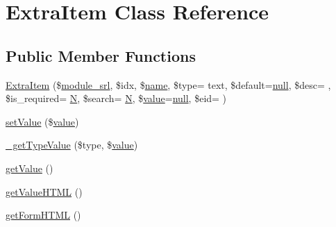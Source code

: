\hypertarget{classExtraItem}{}\section{Extra\+Item Class Reference}
\label{classExtraItem}
\subsection*{Public Member Functions}
\begin{DoxyCompactItemize}
\item 
\hyperlink{classExtraItem_abdf34ec801688507ddbc1acd513d2f8d}{Extra\+Item} (\$\hyperlink{ko_8install_8php_a370bb6450fab1da3e0ed9f484a38b761}{module\+\_\+srl}, \$idx, \$\hyperlink{common_8js_a22c29d2aa8ed6161ce8faa718ef76e68}{name}, \$type= \textquotesingle{}text\textquotesingle{}, \$default=\hyperlink{modernizr_8min_8js_a286f9ec831c5e676eeb493248eab9575}{null}, \$desc= \textquotesingle{}\textquotesingle{}, \$is\+\_\+required= \textquotesingle{}\hyperlink{jquery-1_8x_8min_8js_ab8a5cba0bbaa18ec7f830663874cb9d0}{N}\textquotesingle{}, \$search= \textquotesingle{}\hyperlink{jquery-1_8x_8min_8js_ab8a5cba0bbaa18ec7f830663874cb9d0}{N}\textquotesingle{}, \$\hyperlink{common_2js_2jquery_8js_abe5393d870043cf6aaa1d5ad5fce755c}{value}=\hyperlink{modernizr_8min_8js_a286f9ec831c5e676eeb493248eab9575}{null}, \$eid= \textquotesingle{}\textquotesingle{})
\item 
\hyperlink{classExtraItem_a6bec289dc0622bd882a36cb9b5680b03}{set\+Value} (\$\hyperlink{common_2js_2jquery_8js_abe5393d870043cf6aaa1d5ad5fce755c}{value})
\item 
\hyperlink{classExtraItem_ac285a098cdd05b2c152b3d94c8cb95db}{\+\_\+get\+Type\+Value} (\$type, \$\hyperlink{common_2js_2jquery_8js_abe5393d870043cf6aaa1d5ad5fce755c}{value})
\item 
\hyperlink{classExtraItem_a61ff542aa57144ac9e8d20d40f426486}{get\+Value} ()
\item 
\hyperlink{classExtraItem_a7784f081919e81e4a41ab0c250d6ca52}{get\+Value\+H\+T\+ML} ()
\item 
\hyperlink{classExtraItem_aaedac8843abdf391e8f4d22704606898}{get\+Form\+H\+T\+ML} ()
\end{DoxyCompactItemize}
